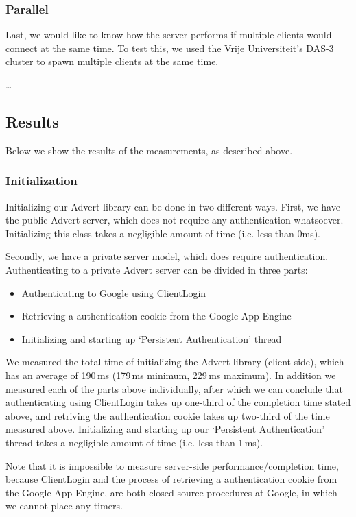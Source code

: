 \subsubsection{Parallel}
Last, we would like to know how the server performs if multiple clients would
connect at the same time. To test this, we used the Vrije Universiteit's DAS-3
cluster to spawn multiple clients at the same time. 

\ldots

\subsection{Results}
Below we show the results of the measurements, as described above.

\subsubsection{Initialization}
Initializing our Advert library can be done in two different ways. First, we
have the public Advert server, which does not require any authentication
whatsoever. Initializing this class takes a negligible amount of time (i.e.
less than 0ms).

Secondly, we have a private server model, which does require authentication.
Authenticating to a private Advert server can be divided in three parts:

\begin{itemize}
  \item Authenticating to Google using ClientLogin
  \item Retrieving a authentication cookie from the Google App Engine
  \item Initializing and starting up `Persistent Authentication' thread
\end{itemize}

We measured the total time of initializing the Advert library (client-side),
which has an average of 190\,ms (179\,ms minimum, 229\,ms maximum). In addition
we measured each of the parts above individually, after which we can conclude
that authenticating using ClientLogin takes up one-third of the completion time
stated above, and retriving the authentication cookie takes up two-third of the
time measured above. Initializing and starting up our `Persistent Authentication'
thread takes a negligible amount of time (i.e. less than 1\,ms).

Note that it is impossible to measure server-side performance/completion time,
because ClientLogin and the process of retrieving a authentication cookie from the
Google App Engine, are both closed source procedures at Google, in which we
cannot place any timers.

